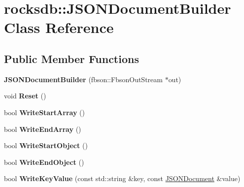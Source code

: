 \hypertarget{classrocksdb_1_1JSONDocumentBuilder}{}\section{rocksdb\+:\+:J\+S\+O\+N\+Document\+Builder Class Reference}
\label{classrocksdb_1_1JSONDocumentBuilder}
\subsection*{Public Member Functions}
\begin{DoxyCompactItemize}
\item 
{\bfseries J\+S\+O\+N\+Document\+Builder} (fbson\+::\+Fbson\+Out\+Stream $\ast$out)\hypertarget{classrocksdb_1_1JSONDocumentBuilder_ad576a62168d75b9b02d34c7b841de458}{}\label{classrocksdb_1_1JSONDocumentBuilder_ad576a62168d75b9b02d34c7b841de458}

\item 
void {\bfseries Reset} ()\hypertarget{classrocksdb_1_1JSONDocumentBuilder_a8b7f8d5c309bca9fdba2963fe7101747}{}\label{classrocksdb_1_1JSONDocumentBuilder_a8b7f8d5c309bca9fdba2963fe7101747}

\item 
bool {\bfseries Write\+Start\+Array} ()\hypertarget{classrocksdb_1_1JSONDocumentBuilder_a6c1e590614f2e8d6f75e45600aa8a182}{}\label{classrocksdb_1_1JSONDocumentBuilder_a6c1e590614f2e8d6f75e45600aa8a182}

\item 
bool {\bfseries Write\+End\+Array} ()\hypertarget{classrocksdb_1_1JSONDocumentBuilder_af9e0e0a04d0531a27e2c65ae79cf6c4d}{}\label{classrocksdb_1_1JSONDocumentBuilder_af9e0e0a04d0531a27e2c65ae79cf6c4d}

\item 
bool {\bfseries Write\+Start\+Object} ()\hypertarget{classrocksdb_1_1JSONDocumentBuilder_aa1bbac7729f273f0f83a7f5fc5dc90ab}{}\label{classrocksdb_1_1JSONDocumentBuilder_aa1bbac7729f273f0f83a7f5fc5dc90ab}

\item 
bool {\bfseries Write\+End\+Object} ()\hypertarget{classrocksdb_1_1JSONDocumentBuilder_a9b1ad02c35affee1ee732e39d50bade9}{}\label{classrocksdb_1_1JSONDocumentBuilder_a9b1ad02c35affee1ee732e39d50bade9}

\item 
bool {\bfseries Write\+Key\+Value} (const std\+::string \&key, const \hyperlink{classrocksdb_1_1JSONDocument}{J\+S\+O\+N\+Document} \&value)\hypertarget{classrocksdb_1_1JSONDocumentBuilder_a83b321329e48e49b070f95c851839bbf}{}\label{classrocksdb_1_1JSONDocumentBuilder_a83b321329e48e49b070f95c851839bbf}


\end{DoxyCompactItemize}
